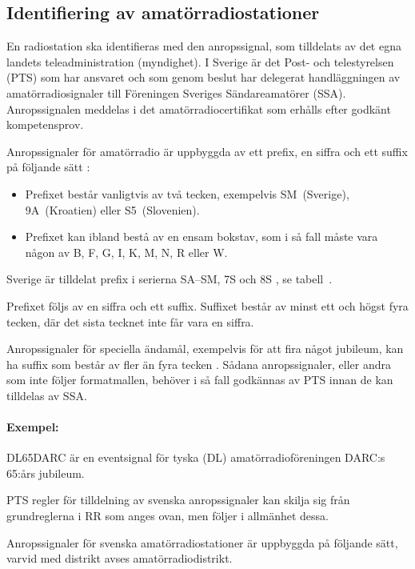 \subsection{Identifiering av amatörradiostationer}

En radiostation ska identifieras med den anropssignal, som tilldelats av det
egna landets teleadministration (myndighet).
I Sverige är det Post- och telestyrelsen (PTS) som har ansvaret och som genom
beslut har delegerat handläggningen av amatörradiosignaler till Föreningen
Sveriges Sändareamatörer (SSA).
Anropssignalen meddelas i det amatörradiocertifikat som erhålls efter godkänt
kompetensprov.

Anropssignaler för amatörradio är uppbyggda av ett prefix, en siffra och ett
suffix på följande sätt \cite[\S19.68, \S19.69]{ITU-RR}:

\begin{itemize}
\item Prefixet består vanligtvis av två tecken, exempelvis SM~(Sverige), 9A~(Kroatien)
eller S5~(Slovenien).
\item Prefixet kan ibland bestå av en ensam bokstav, som i så fall måste vara någon
av B, F, G, I, K, M, N, R eller W.
\end{itemize}

Sverige är tilldelat prefix i serierna SA--SM, 7S och 8S
\cite[Appendix 42]{ITU-RR}, se tabell~.

Prefixet följs av en siffra och ett suffix. Suffixet består av minst ett och
högst fyra tecken, där det sista tecknet inte får vara en siffra.

Anropssignaler för speciella ändamål, exempelvis för att fira något jubileum,
kan ha suffix som består av fler än fyra tecken \cite[\S19.68A]{ITU-RR}.
Sådana anropssignaler, eller andra som inte följer formatmallen, behöver i så
fall godkännas av PTS innan de kan tilldelas av SSA.

\paragraph{Exempel:} DL65DARC är en eventsignal för tyska (DL)
amatörradioföreningen DARC:s 65:års jubileum.

PTS regler för tilldelning av svenska anropssignaler kan skilja sig från
grundreglerna i RR som anges ovan, men följer i allmänhet dessa.

Anropssignaler för svenska amatörradiostationer är uppbyggda på följande
sätt, varvid med distrikt avses amatörradiodistrikt.

